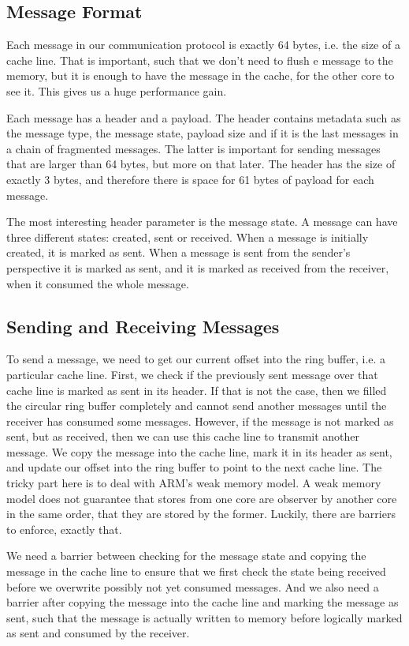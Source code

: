 \subsection{Message Format}

Each message in our communication protocol is exactly 64 bytes, i.e. the size of a cache line. That is important, such that we don't need to flush e message to the memory, but it is enough to have the message in the cache, for the other core to see it. This gives us a huge performance gain.

Each message has a header and a payload. The header contains metadata such as the message type, the message state, payload size and if it is the last messages in a chain of fragmented messages. The latter is important for sending messages that are larger than 64 bytes, but more on that later. The header has the size of exactly 3 bytes, and therefore there is space for 61 bytes of payload for each message.

The most interesting header parameter is the message state. A message can have three different states: created, sent or received. When a message is initially created, it is marked as sent. When a message is sent from the sender's perspective it is marked as sent, and it is marked as received from the receiver, when it consumed the whole message.

\subsection{Sending and Receiving Messages}

To send a message, we need to get our current offset into the ring buffer, i.e. a particular cache line. First, we check if the previously sent message over that cache line is marked as sent in its header. If that is not the case, then we filled the circular ring buffer completely and cannot send another messages until the receiver has consumed some messages. However, if the message is not marked as sent, but as received, then we can use this cache line to transmit another message. We copy the message into the cache line, mark it in its header as sent, and update our offset into the ring buffer to point to the next cache line. The tricky part here is to deal with ARM's weak memory model. A weak memory model does not guarantee that stores from one core are observer by another core in the same order, that they are stored by the former. Luckily, there are barriers to enforce, exactly that.

We need a barrier between checking for the message state and copying the message in the cache line to ensure that we first check the state being received before we overwrite possibly not yet consumed messages. And we also need a barrier after copying the message into the cache line and marking the message as sent, such that the message is actually written to memory before logically marked as sent and consumed by the receiver.

